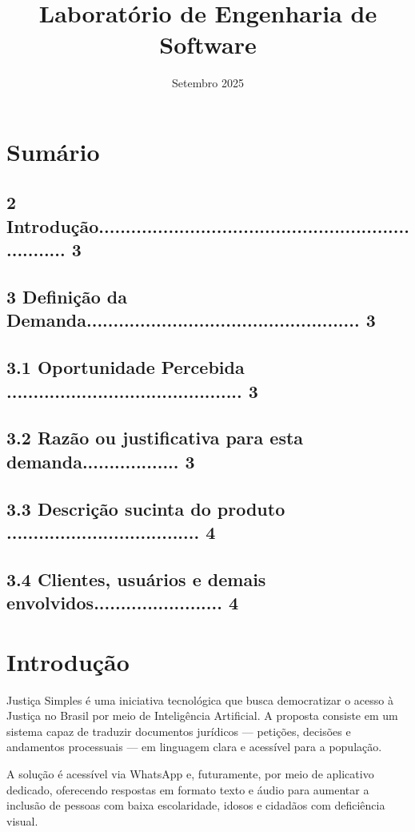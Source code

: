 \documentclass{article}
\title{Laboratório de Engenharia de Software}
\date{Setembro 2025}
\begin{document}
\maketitle
\newpage

\section{Sumário}
\subsection* {2 Introdução..................................................................... 3}
\subsection* {3   Definição da Demanda................................................... 3}
\subsection* {3.1 Oportunidade Percebida ............................................ 3}
\subsection* {3.2 Razão ou justificativa para esta demanda.................. 3}
\subsection* {3.3 Descrição sucinta do produto .................................... 4}
\subsection* {3.4 Clientes, usuários e demais envolvidos........................ 4}
\newpage

\section{Introdução}
Justiça Simples é uma iniciativa tecnológica que busca democratizar o acesso à Justiça no Brasil por meio de Inteligência Artificial. A proposta consiste em um sistema capaz de traduzir documentos jurídicos — petições, decisões e andamentos processuais — em linguagem clara e acessível para a população.

A solução é acessível via WhatsApp e, futuramente, por meio de aplicativo dedicado, oferecendo respostas em formato texto e áudio para aumentar a inclusão de pessoas com baixa escolaridade, idosos e cidadãos com deficiência visual.
\end{document}
